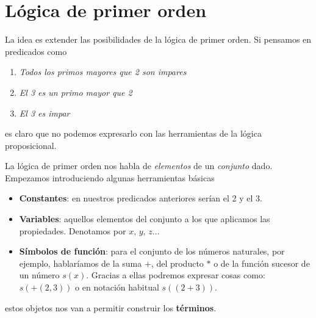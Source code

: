 \section{Lógica de primer orden}
La idea es extender las posibilidades de la lógica de primer orden. Si pensamos en predicados como 
\begin{enumerate}
	\item \textit{Todos los primos mayores que 2 son impares}
	\item \textit{El 3 es un primo mayor que 2}
	\item \textit{El 3 es impar}
\end{enumerate}
es claro que no podemos expresarlo con las herramientas de la lógica proposicional. 

La lógica de primer orden nos habla de \textit{elementos} de un \textit{conjunto} dado. Empezamos introduciendo algunas herramientas básicas 
\begin{itemize}
	\item \textbf{Constantes}: en nuestros predicados anteriores serían el 2 y el 3. 
	\item \textbf{Variables}: aquellos elementos del conjunto a los que aplicamos las propiedades. Denotamos por $x,\, y, \, z \ldots$
	\item \textbf{Símbolos de función}: para el conjunto de los números naturales, por ejemplo, hablaríamos de la suma $+$, del producto $\ast$ o de la función sucesor de un número $s(x)$. Gracias a ellas podremos expresar cosas como: $s(+(2,3))$ o en notación habitual $s((2+3))$.
\end{itemize}
estos objetos nos van a permitir construir los \textbf{términos}. 
